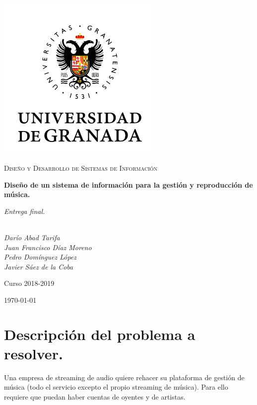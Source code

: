 \documentclass[12pt,a4paper]{article}
\begin{document}
\begin{titlepage}
  \centering
  \includegraphics[width=0.6\textwidth]{imagenes/ugr.png}\par\vspace{1cm}
  {\scshape\large Diseño y Desarrollo de Sistemas de Información \par} \vspace{1cm}
  {\huge\bfseries Diseño de un sistema de información para la gestión y reproducción de música. \par}
  \vspace{0.4cm}
  {\large\itshape Entrega final.}
  \vspace{0.6cm}
  {\large\itshape \\ Darío Abad Tarifa \\ Juan Francisco Díaz Moreno \\ Pedro Domínguez López \\ Javier Sáez de la Coba \par} \vspace{1.00cm}
  Curso 2018-2019 \\
  \vfill

  {\large \today\par}
\end{titlepage}

\tableofcontents
\newpage

\setlength{\parskip}{10pt}

\section{Descripción del problema a resolver.}

Una empresa de streaming de audio quiere rehacer su plataforma de gestión de música (todo el servicio excepto el propio streaming de música). Para ello requiere que puedan haber cuentas de oyentes y de artistas.
\end{document}

